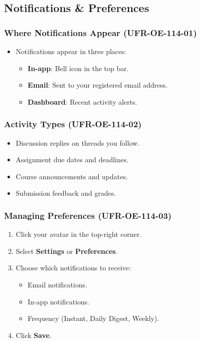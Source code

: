 \subsection{Notifications \& Preferences}

\subsubsection{Where Notifications Appear (UFR-OE-114-01)}
\begin{itemize}
    \item Notifications appear in three places:
    \begin{itemize}
        \item \textbf{In-app}: Bell icon in the top bar.
        \item \textbf{Email}: Sent to your registered email address.
        \item \textbf{Dashboard}: Recent activity alerts.
    \end{itemize}
\end{itemize}

\subsubsection{Activity Types (UFR-OE-114-02)}
\begin{itemize}
    \item Discussion replies on threads you follow.
    \item Assignment due dates and deadlines.
    \item Course announcements and updates.
    \item Submission feedback and grades.
\end{itemize}

\subsubsection{Managing Preferences (UFR-OE-114-03)}
\begin{enumerate}
    \item Click your avatar in the top-right corner.
    \item Select \textbf{Settings} or \textbf{Preferences}.
    \item Choose which notifications to receive:
    \begin{itemize}
        \item Email notifications.
        \item In-app notifications.
        \item Frequency (Instant, Daily Digest, Weekly).
    \end{itemize}
    \item Click \textbf{Save}.
\end{enumerate}

